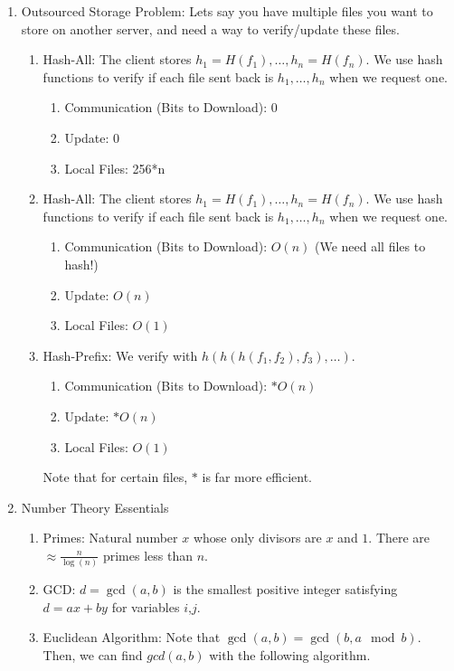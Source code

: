 \documentclass[12pt,letterpaper]{article}
\begin{document}
\begin{enumerate}
		\item Outsourced Storage Problem: Lets say you have multiple files you want to store on another server, and need a way to verify/update these files.
		\begin{enumerate}
			\item Hash-All: The client stores $h_1=H(f_1),\ldots,h_n=H(f_n)$. We use hash functions to verify if each file sent back is $h_1,\ldots,h_n$ when we request one.
			\begin{enumerate}
				\item Communication (Bits to Download): 0
				\item Update: 0
				\item Local Files: 256*n
			\end{enumerate}
			\item Hash-All: The client stores $h_1=H(f_1),\ldots,h_n=H(f_n)$. We use hash functions to verify if each file sent back is $h_1,\ldots,h_n$ when we request one.
			\begin{enumerate}
				\item Communication (Bits to Download): $O(n)$ (We need all files to hash!)
				\item Update: $O(n)$
				\item Local Files: $O(1)$
			\end{enumerate}
			\item Hash-Prefix: We verify with $h(h(h(f_1,f_2),f_3),\ldots)$.
			\begin{enumerate}
				\item Communication (Bits to Download): $*O(n)$
				\item Update: $*O(n)$
				\item Local Files: $O(1)$
			\end{enumerate}
			Note that for certain files, $*$ is far more efficient.
		\end{enumerate}\newpage
		\item Number Theory Essentials
		\begin{enumerate}
			\item Primes: Natural number $x$ whose only divisors are $x$ and $1$. There are $\approx\frac{n}{\log(n)}$ primes less than $n$.
			\item GCD: $d=\gcd(a,b)$ is the smallest positive integer satisfying $d=ax+by$ for variables $i$,$j$.
			\item Euclidean Algorithm: Note that $\gcd(a,b)=\gcd(b,a\mod b)$. Then, we can find $gcd(a,b)$ with the following algorithm.
		\begin{algorithmic}

\end{algorithmic}
\end{enumerate}
\end{enumerate}
\end{document}
